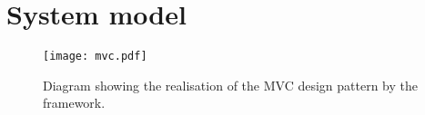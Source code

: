 \section{System model}

\begin{figure}[h]
	\centering
	\texttt{[image: mvc.pdf]}
	\caption{Diagram showing the realisation of the \gls{MVC} design pattern by the framework.}
	\label{img:MVC}
\end{figure}


